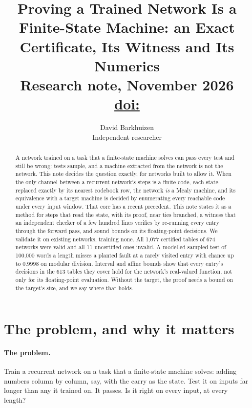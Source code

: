 \documentclass[11pt]{article}
\title{Proving a Trained Network Is a Finite-State Machine: an Exact Certificate, Its Witness and
Its Numerics\\[0.5em]
\large Research note, November 2026\\[0.2em]
\ifx\notedoi\empty\draftnote{the DOI}\else\href{https://doi.org/\notedoi}{doi:\notedoi}\fi}
\author{
  David Barkhuizen\\
  Independent researcher
}
\date{}
\newcommand{\pn}[2]{#2}
\theoremstyle{definition}
\begin{document}
\maketitle

\begin{abstract}
A network trained on a task that a finite-state machine solves can pass every test and still be
wrong: tests sample, and a machine extracted from the network is not the network. This note decides
the question exactly, for networks built to allow it. When the only channel between a recurrent
network's steps is a finite code, each state replaced exactly by its nearest codebook row, the
network \emph{is} a Mealy machine, and its equivalence with a target machine is decided by enumerating
every reachable code under every input window. That core has a recent precedent. This note states it
as a method for steps that read the state, with its proof, near ties branched, a witness that an
independent checker of a few hundred lines verifies by re-running every entry through the forward pass,
and sound bounds on its floating-point decisions. We validate it on existing networks, training none.
All \pn{recert-certified}{1{,}077} certified tables of \pn{recert-certified-networks}{674} networks were
valid and all \pn{recert-uncertified}{11} uncertified ones invalid. A modelled sampled test of 100{,}000
words a length misses a planted fault at a rarely visited entry with chance up to
\pn{fault-division-worst}{0.9998} on modular division. Interval and affine bounds show that every entry's
decisions in the \pn{bound-tables}{613} tables they cover hold for the network's real-valued function, not
only for its floating-point evaluation. Without the target, the proof needs a bound on the target's size,
and we say where that holds.
\end{abstract}

\section{The problem, and why it matters}

\paragraph{The problem.} Train a recurrent network on a task that a finite-state machine solves:
adding numbers column by column, say, with the carry as the state. Test it on inputs far longer than
any it trained on. It passes. Is it right on every input, at every length?
\end{document}
